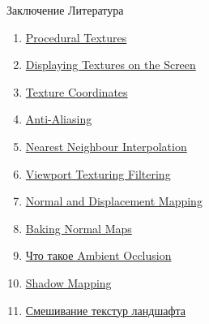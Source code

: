 \documentclass{beamer}
\begin{document}
	\begin{frame}{Заключение}
		Литература
		\begin{enumerate}
			\item \href{http://www.upvector.com/?section=Tutorials&subsection=Intro\ to\ Procedural\ Textures}{Procedural Textures}
			\item \href{http://euklid.mi.uni-koeln.de/c/mirror/www.cs.curtin.edu.au/units/cg351-551/notes/lect9i1.html}{Displaying Textures on the Screen}
			\item \href{https://learn.microsoft.com/en-us/windows/win32/direct3d9/texture-coordinates}{Texture Coordinates}
			\item \href{https://www.pcmag.com/encyclopedia/term/anti-aliasing}{Anti-Aliasing}
			\item \href{https://kwojcicki.github.io/blog/NEAREST-NEIGHBOUR}{Nearest Neighbour Interpolation}
			\item \href{https://community.adobe.com/t5/substance-3d-painter-discussions/viewport-texturing-filtering/td-p/13444697}{Viewport Texturing Filtering}
			\item \href{https://ycpcs.github.io/cs470-fall2014/labs/lab12-2.html}{Normal and Displacement Mapping}
			\item \href{https://typhen.artstation.com/blog/BDr6/this-is-normal-2-baking-normal-maps}{Baking Normal Maps}
			\item \href{https://3dclub.com/blog/kak-ispolzovat-karty-ao}{Что такое Ambient Occlusion}
			\item \href{https://gamedev.ru/code/forum/?id=175200}{Shadow Mapping}
			\item \href{https://habr.com/ru/articles/180743}{Смешивание текстур ландшафта}
		\end{enumerate}

	\end{frame}

	
\end{document}
